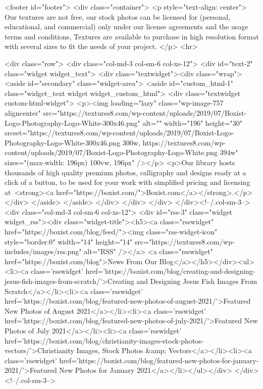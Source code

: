 	<footer id="footer">
		<div class="container">
		    <p style="text-align: center">
Our textures are not free, our stock photos can be licensed for (personal, educational, and commercial) only under our license agreements and the usage terms and conditions, Textures are available to purchase in high resolution format with several sizes to fit the needs of your project.
</p>
<hr>

			<div class="row">
								<div class="col-md-3 col-sm-6 col-xs-12">
					<div id="text-2" class="widget widget_text">			<div class="textwidget"><div class="wrap">
<aside id="secondary" class="widget-area">
<aside id="custom_html-1" class="widget_text widget widget_custom_html">
<div class="textwidget custom-html-widget">
<p><img loading="lazy" class="wp-image-757 aligncenter" src="https://textures8.com/wp-content/uploads/2019/07/Boxist-Logo-Photography-Logo-White-300x46.png" alt="" width="196" height="30" srcset="https://textures8.com/wp-content/uploads/2019/07/Boxist-Logo-Photography-Logo-White-300x46.png 300w, https://textures8.com/wp-content/uploads/2019/07/Boxist-Logo-Photography-Logo-White.png 394w" sizes="(max-width: 196px) 100vw, 196px" /></p>
<p>Our library hosts thousands of high quality premium photos, calligraphy and designs ready at a click of a button, to be used for your work with simplified pricing and licensing at <strong><a href="https://boxist.com/">Boxist.com</a></strong>.</p>
</div>
</aside>
</aside>
</div>
</div>
		</div>				</div><!--/.col-sm-3-->
				<div class="col-md-3 col-sm-6 col-xs-12">
					<div id="rss-3" class="widget widget_rss"><div class="widget-title"><h5><a class="rsswidget" href="https://boxist.com/blog/feed/"><img class="rss-widget-icon" style="border:0" width="14" height="14" src="https://textures8.com/wp-includes/images/rss.png" alt="RSS" /></a> <a class="rsswidget" href="https://boxist.com/blog">News From Our Blog</a></h5></div><ul><li><a class='rsswidget' href='https://boxist.com/blog/creating-and-designing-jesus-fish-images-from-scratch/'>Creating and Designing Jesus Fish Images From Scratch</a></li><li><a class='rsswidget' href='https://boxist.com/blog/featured-new-photos-of-august-2021/'>Featured New Photos of August 2021</a></li><li><a class='rsswidget' href='https://boxist.com/blog/featured-new-photos-of-july-2021/'>Featured New Photos of July 2021</a></li><li><a class='rsswidget' href='https://boxist.com/blog/christianity-images-stock-photos-vectors/'>Christianity Images, Stock Photos &amp; Vectors</a></li><li><a class='rsswidget' href='https://boxist.com/blog/featured-new-photos-for-january-2021/'>Featured New Photos for January 2021</a></li></ul></div>				</div><!--/.col-sm-3-->
